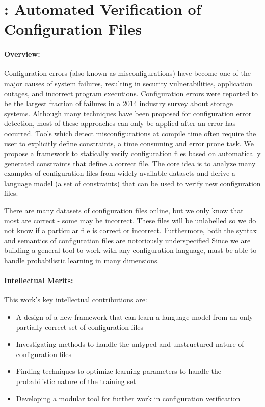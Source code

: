 \section*{\app: Automated Verification of Configuration Files}
\paragraph{Overview:} 
Configuration errors (also known as misconfigurations) have become one of the major causes of system failures, resulting in security vulnerabilities, application outages, and incorrect program executions. 
Configuration errors were reported to be the largest fraction of failures in a 2014 industry survey about storage systems. 
Although many techniques have been proposed for configuration error detection, most of these approaches can only be applied after an error has occurred.
Tools which detect misconfigurations at compile time often require the user to explicitly define constraints, a time consuming and error prone task.
We propose a framework to statically verify configuration files based on automatically generated constraints that define a correct file.
The core idea is to analyze many examples of configuration files from widely available datasets and derive a language model (a set of constraints) that can be used to verify new configuration files.

There are many datasets of configuration files online, but we only know that most are correct - some may be incorrect.
These files will be unlabelled so we do not know if a particular file is correct or incorrect.
Furthermore, both the syntax and semantics of configuration files are notoriously underspecified
Since we are building a general tool to work with any configuration language, \app must be able to handle probabilistic learning in many dimensions.

\paragraph{Intellectual Merits:} This work's key intellectual contributions are:
\begin{itemize}
\item A design of a new framework that can learn a language model from an only partially correct set of configuration files
\item Investigating methods to handle the untyped and unstructured nature of configuration files
\item Finding techniques to optimize learning parameters to handle the probabilistic nature of the training set
\item Developing a modular tool for further work in configuration verification
\end{itemize}

